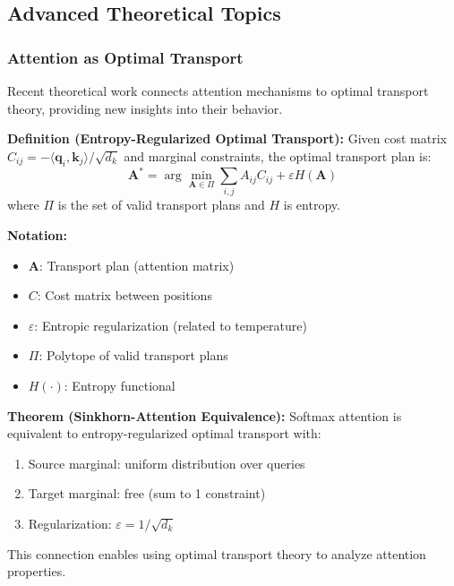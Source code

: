 \documentclass[11pt]{article}
\begin{document}
\subsection{Advanced Theoretical Topics}

\subsubsection{Attention as Optimal Transport}

Recent theoretical work connects attention mechanisms to optimal transport theory, providing new insights into their behavior.

\textbf{Definition (Entropy-Regularized Optimal Transport):} Given cost matrix $C_{ij} = -\langle \mathbf{q}_i, \mathbf{k}_j \rangle / \sqrt{d_k}$ and marginal constraints, the optimal transport plan is:
\begin{equation}
\mathbf{A}^* = \arg\min_{\mathbf{A} \in \Pi} \sum_{i,j} A_{ij}C_{ij} + \varepsilon H(\mathbf{A})
\end{equation}
where $\Pi$ is the set of valid transport plans and $H$ is entropy.

\begin{notationbox}
\textbf{Notation:}
\begin{itemize}
    \item $\mathbf{A}$: Transport plan (attention matrix)
    \item $C$: Cost matrix between positions
    \item $\varepsilon$: Entropic regularization (related to temperature)
    \item $\Pi$: Polytope of valid transport plans
    \item $H(\cdot)$: Entropy functional
\end{itemize}
\end{notationbox}

\textbf{Theorem (Sinkhorn-Attention Equivalence):} Softmax attention is equivalent to entropy-regularized optimal transport with:
\begin{enumerate}
    \item Source marginal: uniform distribution over queries
    \item Target marginal: free (sum to 1 constraint)
    \item Regularization: $\varepsilon = 1/\sqrt{d_k}$
\end{enumerate}

This connection enables using optimal transport theory to analyze attention properties.
\end{document}
